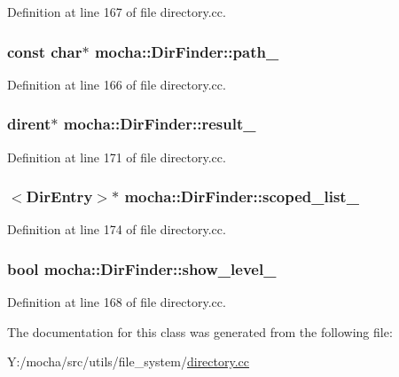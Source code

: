 Definition at line 167 of file directory.cc.

\hypertarget{classmocha_1_1_dir_finder_a1ef92d885780984ecb7b82ba9b4b5543}{
\subsubsection[{path\_\-}]{\setlength{\rightskip}{0pt plus 5cm}const char$\ast$ {\bf mocha::DirFinder::path\_\-}}}
\label{classmocha_1_1_dir_finder_a1ef92d885780984ecb7b82ba9b4b5543}


Definition at line 166 of file directory.cc.

\hypertarget{classmocha_1_1_dir_finder_aaab8894e08b3e4cd81e4df5b4157c2c2}{
\subsubsection[{result\_\-}]{\setlength{\rightskip}{0pt plus 5cm}dirent$\ast$ {\bf mocha::DirFinder::result\_\-}}}
\label{classmocha_1_1_dir_finder_aaab8894e08b3e4cd81e4df5b4157c2c2}


Definition at line 171 of file directory.cc.

\hypertarget{classmocha_1_1_dir_finder_aec3cfce5cc65650949d6ba339832492a}{
\subsubsection[{scoped\_\-list\_\-}]{$<${\bf DirEntry}$>$$\ast$ {\bf mocha::DirFinder::scoped\_\-list\_\-}}}
\label{classmocha_1_1_dir_finder_aec3cfce5cc65650949d6ba339832492a}


Definition at line 174 of file directory.cc.

\hypertarget{classmocha_1_1_dir_finder_aa050793a3b04ea0b57a6971085f85969}{
\subsubsection[{show\_\-level\_\-}]{\setlength{\rightskip}{0pt plus 5cm}bool {\bf mocha::DirFinder::show\_\-level\_\-}}}
\label{classmocha_1_1_dir_finder_aa050793a3b04ea0b57a6971085f85969}


Definition at line 168 of file directory.cc.



The documentation for this class was generated from the following file:\begin{DoxyCompactItemize}
\item 
Y:/mocha/src/utils/file\_\-system/\hyperlink{directory_8cc}{directory.cc}\end{DoxyCompactItemize}
